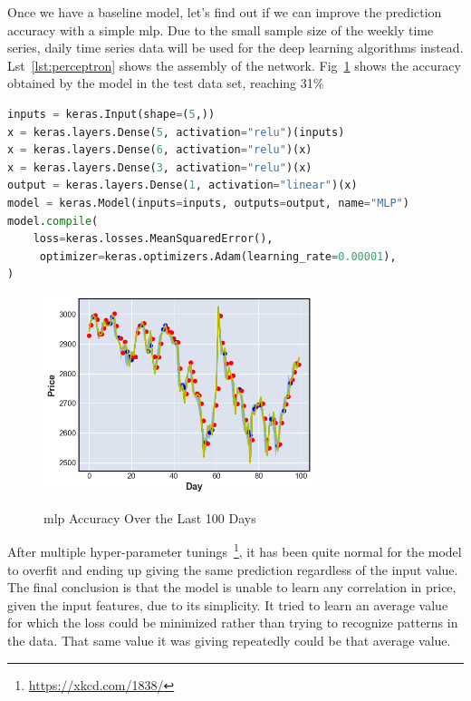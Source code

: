 Once we have a baseline model, let's find out if we can improve the prediction accuracy with a simple \gls{mlp}. Due to the small sample size of the weekly time series, daily time series data will be used for the deep learning algorithms instead. Lst~\ref{lst:perceptron} shows the assembly of the network. Fig~\ref{fig:perceptron} shows the accuracy obtained by the model in the test data set, reaching 31\%

\begin{lstlisting}[language=python,caption=\gls{mlp} Assembly,label={lst:perceptron}]
inputs = keras.Input(shape=(5,))
x = keras.layers.Dense(5, activation="relu")(inputs)
x = keras.layers.Dense(6, activation="relu")(x)
x = keras.layers.Dense(3, activation="relu")(x)
output = keras.layers.Dense(1, activation="linear")(x)
model = keras.Model(inputs=inputs, outputs=output, name="MLP")
model.compile(
    loss=keras.losses.MeanSquaredError(),
     optimizer=keras.optimizers.Adam(learning_rate=0.00001),
)
\end{lstlisting}

\begin{figure}[H]
    \centering
    \caption{\gls{mlp} Accuracy Over the Last 100 Days}
    \includegraphics[width=0.7\textwidth]{figures/mlp.png}
    \label{fig:perceptron}
\end{figure}

After multiple hyper-parameter tunings~\footnote{\url{https://xkcd.com/1838/}}, it has been quite normal for the model to overfit and ending up giving the same prediction regardless of the input value. The final conclusion is that the model is unable to learn any correlation in price, given the input features, due to its simplicity. It tried to learn an average value for which the loss could be minimized rather than trying to recognize patterns in the data. That same value it was giving repeatedly could be that average value.

